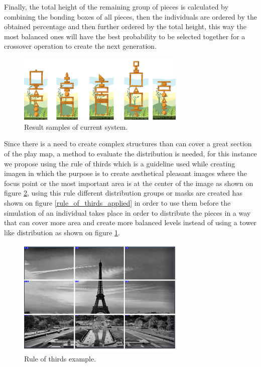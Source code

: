 \documentclass[conference]{IEEEtran}
\begin{document}
Finally, the total height of the remaining group of pieces is calculated by combining the bonding boxes of all pieces, then the individuals are ordered by the obtained percentage and then further ordered by the total height, this way the most balanced ones will have the best probability to be selected together for a crossover operation to create the next generation.

\begin{figure}[htbp]
\centerline{\includegraphics[width=80mm]{Images/result_example.png}}
\caption{Result samples of current system.}
\label{results_old}
\end{figure}

Since there is a need to create complex structures than can cover a great section of the play map, a method to evaluate the distribution is needed, for this instance we propose using the rule of thirds \cite{DarrenRowse} which is a guideline used while creating imagen in which the purpose is to create aesthetical pleasant images where the focus point or the most important area is at the center of the image as shown on figure \ref{rule_of_thirds}, using this rule different distribution groups or masks are created has shown on figure \ref{rule_of_thirds_applied} in order to use them before the simulation of an individual takes place in order to distribute the pieces in a way that can cover more area and create more balanced levels instead of using a tower like distribution as shown on figure \ref{results_old}.

\begin{figure}[htbp]
    \centerline{\includegraphics[width=80mm]{Images/ruleofthirds_example.png}}
    \caption{Rule of thirds example.}
    \label{rule_of_thirds}
\end{figure}
\end{document}
